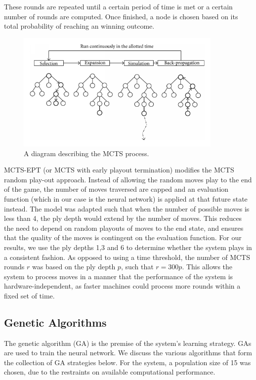 \documentclass[12pt,a4paper]{article}
\begin{document}
        These rounds are repeated until a certain period of time is met or a certain number of rounds are computed. Once finished, a node is chosen based on its total probability of reaching an winning outcome.

        \begin{figure}[!ht]
            \centering
            \includegraphics[width=100mm]{images/montecarlo.png}
            \caption{A diagram describing the MCTS process.}
        \end{figure}

        MCTS-EPT (or MCTS with early playout termination) modifies the MCTS random play-out approach. Instead of allowing the random moves play to the end of the game, the number of moves traversed are capped and an evaluation function (which in our case is the neural network) is applied at that future state instead. \cite{lorentz_using_2016} The model was adapted such that when the number of possible moves is less than 4, the ply depth would extend by the number of moves. This reduces the need to depend on random playouts of moves to the end state, and ensures that the quality of the moves is contingent on the evaluation function. For our results, we use the ply depths 1,3 and 6 to determine whether the system plays in a consistent fashion. As opposed to using a time threshold, the number of MCTS rounds $r$ was based on the ply depth $p$, such that $r=300p$. This allows the system to process moves in a manner that the performance of the system is hardware-independent, as faster machines could process more rounds within a fixed set of time.



    \subsection{Genetic Algorithms}
        The genetic algorithm (GA) is the premise of the system's learning strategy. GAs are used to train the neural network. We discuss the various algorithms that form the collection of GA strategies below. For the system, a population size of 15 was chosen, due to the restraints on available computational performance.
\end{document}
